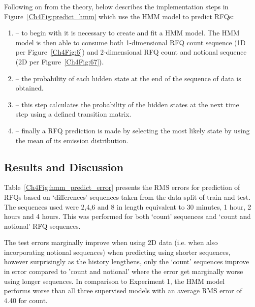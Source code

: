 Following on from the theory, below describes the implementation steps in Figure~\ref{Ch4Fig:predict_hmm} which use the HMM model to predict RFQs:

\begin{enumerate}
    \item {} -- to begin with it is necessary to create and fit a HMM model. The HMM model is then able to consume both 1-dimensional RFQ count sequence (1D per Figure~\ref{Ch4Fig:6}) and 2-dimensional RFQ count and notional sequence (2D per Figure~\ref{Ch4Fig:67}). 
    
    \item {} -- the probability of each hidden state at the end of the sequence of data is obtained.
    
    \item {} -- this step calculates the probability of the hidden states at the next time step using a defined transition matrix.
    
     \item {} -- finally a RFQ prediction is made by selecting the most likely state by using the mean of its emission distribution.
\end{enumerate}    

\subsection{Results and Discussion}

Table~\ref{Ch4Fig:hmm_predict_error} presents the RMS errors for prediction of RFQs based on `differences' sequences taken from the data split of train and test. The sequences used were 2,4,6 and 8 in length equivalent to 30 minutes, 1 hour, 2 hours and 4 hours. This was performed for both `count' sequences and `count and notional' RFQ sequences. 

The test errors marginally improve when using 2D data (i.e. when also incorporating notional sequences) when predicting using shorter sequences, however surprisingly as the history lengthens, only the `count' sequences improve in error compared to 'count and notional' where the error get marginally worse using longer sequences. In comparison to Experiment 1, the HMM model performs worse than all three supervised models with an average RMS error of 4.40 for count.


